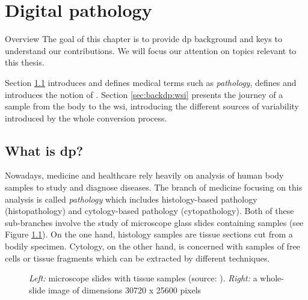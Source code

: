 \chapter{Digital pathology}
\label{chap:backdp}

\begin{overview}{Overview}
  The goal of this chapter is to provide \acrlong{dp} background and keys to understand our contributions. We will focus our attention on topics relevant to this thesis. 
  
  Section \ref{sec:backdp:whatisdp} introduces and defines medical terms such as \textit{pathology}, defines  and introduces the notion of . Section \ref{sec:backdp:wsi} presents the journey of a sample from the body to the \acrshort{wsi}, introducing the different sources of variability introduced by the whole conversion process. 
\end{overview}


\section{What is \acrlong{dp}?}
\label{sec:backdp:whatisdp}

Nowadays, medicine and healthcare rely heavily on analysis of human body samples to study and diagnose diseases. The branch of medicine focusing on this analysis is called \textit{pathology} which includes histology-based pathology (\aka histopathology) and cytology-based pathology (\aka cytopathology). Both of these sub-branches involve the study of microscope glass slides containing samples (see Figure \ref{fig:backdp:glassslides}). On the one hand, histology samples are tissue sections cut from a bodily specimen. Cytology, on the other hand, is concerned with samples of free cells or tissue fragments which can be extracted by different techniques. 

\begin{figure}
  \centering
  \hspace{1cm}
  \caption{\textit{Left:} microscope slides with tissue samples (source: \parencite{img:glassslides}). \textit{Right:} a whole-slide image of dimensions 30720 x 25600 pixels}
  \label{fig:backdp:glassslides}
\end{figure}

